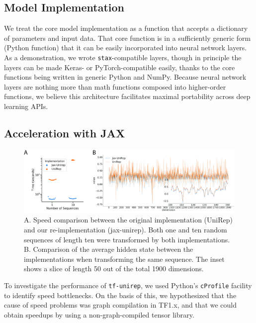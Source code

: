 \documentclass[twoside,11pt]{article}
\begin{document}
\subsection{Model Implementation}

We treat the core model implementation as a function
that accepts a dictionary of parameters and input data.
That core function is in a sufficiently generic form (Python function)
that it can be easily incorporated into neural network layers.
As a demonstration, we wrote \verb|stax|-compatible layers,
though in principle the layers can be made Keras- or PyTorch-compatible easily,
thanks to the core functions being written in generic Python and NumPy.
Because neural network layers are nothing more than math functions
composed into higher-order functions,
we believe this architecture facilitates maximal portability
across deep learning APIs.

\subsection{Acceleration with JAX}

\begin{figure}[!tpb]
    \centerline{\includegraphics[width=6in]{fig01.jpg}}
    \caption{
        A. Speed comparison between the original implementation (UniRep)
        and our re-implementation (jax-unirep).
        Both one and ten random sequences of length ten
        were transformed by both implementations.
        B. Comparison of the average hidden state between the implementations
        when transforming the same sequence.
        The inset shows a slice of length 50 out of the total 1900 dimensions.
    }
    \label{fig:fig01}
\end{figure}

To investigate the performance of \verb|tf-unirep|,
we used Python's \verb|cProfile| facility to identify speed bottlenecks.
On the basis of this, we hypothesized that the cause of speed problems
was graph compilation in TF1.x,
and that we could obtain speedups by using
a non-graph-compiled tensor library.
\end{document}
